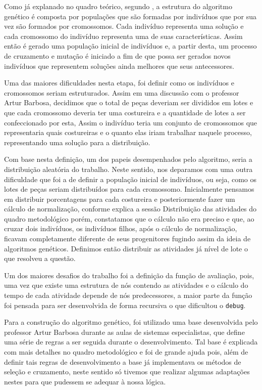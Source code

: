 \par Como já explanado no quadro teórico, segundo , a estrutura do algoritmo genético é composta
por populações que são formadas por indivíduos que por sua vez são formados por cromossomos.
Cada indivíduo representa uma solução e cada cromossomo do indivíduo representa uma de suas características. 
Assim então é gerado uma população inicial de indivíduos e, a partir desta, um processo de cruzamento 
e mutação é iniciado a fim de que possa ser gerados novos indivíduos que representem soluções ainda melhores 
que seus antecessores.

\par Uma das maiores dificuldades nesta etapa, foi definir como os indivíduos e cromossomos seriam estruturados. Assim em uma discussão com o professor Artur Barbosa, decidimos que o total de peças deveriam ser divididos em lotes e que cada cromossomo deveria ter uma costureira 
e a quantidade de lotes a ser confeccionado por esta, Assim o indivíduo teria um
conjunto de cromossomos que representaria quais costureiras e o quanto elas iriam trabalhar naquele processo, representando uma solução para a distribuição.

\par Com base nesta definição, um dos papeis desempenhados pelo algoritmo, seria a distribuição aleatória do trabalho. Neste
sentido, nos deparamos com uma outra dificuldade que foi a de definir a população inicial de indivíduos, ou seja, 
como os lotes de peças seriam distribuídos para cada cromossomo. Inicialmente pensamos em distribuir porcentagens para cada costureira
e posteriormente fazer um cálculo de normalização, conforme explica a sessão Distribuição das atividades do quadro metodológico porém,
constatamos que o cálculo não era preciso e que, ao cruzar dois indivíduos, os indivíduos filhos, após o cálculo de normalização, ficavam
completamente diferente de seus progenitores fugindo assim da ideia de algoritmos genéticos. Definimos então distribuir as atividades já 
nível de lote o que resolveu a questão. 

\par Um dos maiores desafios do trabalho foi a definição da função de avaliação, pois, uma vez que existe uma estrutura de nós contendo
as atividades e o cálculo do tempo de cada atividade depende de nós predecessores, a maior parte da função foi pensada para ser 
desenvolvida de forma recursiva o que dificultou o \texttt{debug}. 

\par Para a construção do algoritmo genético, foi utilizado uma base desenvolvida pelo professor Artur Barbosa 
durante as aulas de sistemas especialistas, que define uma série de regras a ser
seguida durante o desenvolvimento. Tal base é explicada com mais detalhes no
quadro metodológico e foi de grande ajuda pois, além de definir tais
regras de desenvolvimento a base já implementava os métodos de seleção e cruzamento, neste sentido só tivemos que realizar algumas adaptações nestes para que pudessem se adequar à nossa lógica.

